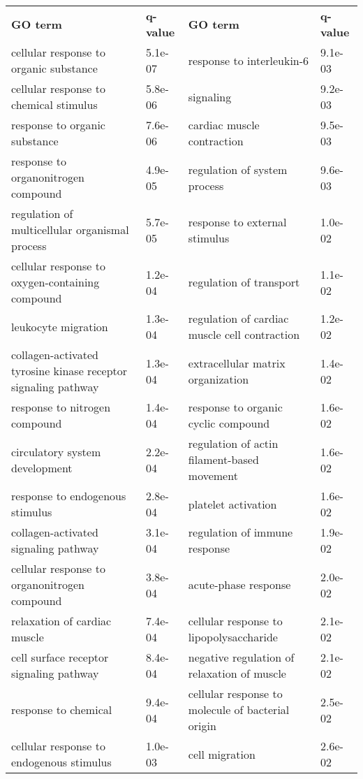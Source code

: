 \documentclass[fleqn,10pt]{SelfArx} %
\begin{document}
\begin{table}[!htb]
		\centering
		\scriptsize
		\begin{tabularx}{\textwidth}{XlXl}
		\rowcolor{NavyBlue!80}
		\textbf{\color{white} GO term} & \textbf{\color{white} q-value} & \textbf{\color{white} GO term} & \textbf{\color{white} q-value} \\
		cellular response to organic substance & 5.1e-07 & response to interleukin-6 & 9.1e-03 \\ 
		cellular response to chemical stimulus & 5.8e-06 & signaling & 9.2e-03 \\ 
		response to organic substance & 7.6e-06 & cardiac muscle contraction & 9.5e-03 \\ 
		response to organonitrogen compound & 4.9e-05 & regulation of system process & 9.6e-03 \\ 
		regulation of multicellular organismal process & 5.7e-05 & response to external stimulus & 1.0e-02 \\ 
		cellular response to oxygen-containing compound & 1.2e-04 & regulation of transport & 1.1e-02 \\ 
		leukocyte migration & 1.3e-04 & regulation of cardiac muscle cell contraction & 1.2e-02 \\ 
		collagen-activated tyrosine kinase receptor signaling pathway & 1.3e-04 & extracellular matrix organization & 1.4e-02 \\ 
		response to nitrogen compound & 1.4e-04 & response to organic cyclic compound & 1.6e-02 \\ 
		circulatory system development & 2.2e-04 & regulation of actin filament-based movement & 1.6e-02 \\ 
		response to endogenous stimulus & 2.8e-04 & platelet activation & 1.6e-02 \\ 
		collagen-activated signaling pathway & 3.1e-04 & regulation of immune response & 1.9e-02 \\ 
		cellular response to organonitrogen compound & 3.8e-04 & acute-phase response & 2.0e-02 \\ 
		relaxation of cardiac muscle & 7.4e-04 & cellular response to lipopolysaccharide & 2.1e-02 \\ 
		cell surface receptor signaling pathway & 8.4e-04 & negative regulation of relaxation of muscle & 2.1e-02 \\ 
		response to chemical & 9.4e-04 & cellular response to molecule of bacterial origin & 2.5e-02 \\ 
		cellular response to endogenous stimulus & 1.0e-03 & cell migration & 2.6e-02 \\ 

\end{tabularx}
\end{table}
\end{document}
